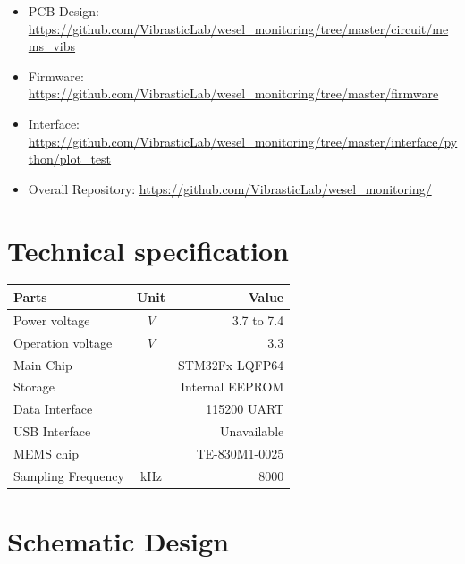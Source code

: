 \documentclass[a4paper,12pt,oneside,pdflatex,italian,final,twocolumn]{article}
\begin{document}
	\begin{itemize}
		\item PCB Design: \url{https://github.com/VibrasticLab/wesel_monitoring/tree/master/circuit/mems_vibs}

		\item Firmware: \url{https://github.com/VibrasticLab/wesel_monitoring/tree/master/firmware}

		\item Interface: \url{https://github.com/VibrasticLab/wesel_monitoring/tree/master/interface/python/plot_test}

		\item Overall Repository: \url{https://github.com/VibrasticLab/wesel_monitoring/}
	\end{itemize}

	\section{Technical specification}
	\centering
	\begin{tabular}{lcr}
		\toprule
		Parts & Unit & Value \\
		\midrule
		Power voltage & $V$ & 3.7 to 7.4 \\
		Operation voltage & $V$ & 3.3 \\
		Main Chip & & STM32Fx LQFP64 \\
		Storage & & Internal EEPROM \\
		Data Interface & & 115200 UART \\
		USB Interface & & Unavailable \\
		MEMS chip & & TE-830M1-0025 \\
		Sampling Frequency & kHz & 8000 \\
		\bottomrule
	\end{tabular}

	\raggedright

	\section{Schematic Design}

	\newpage
	

	\newpage
\end{document}
